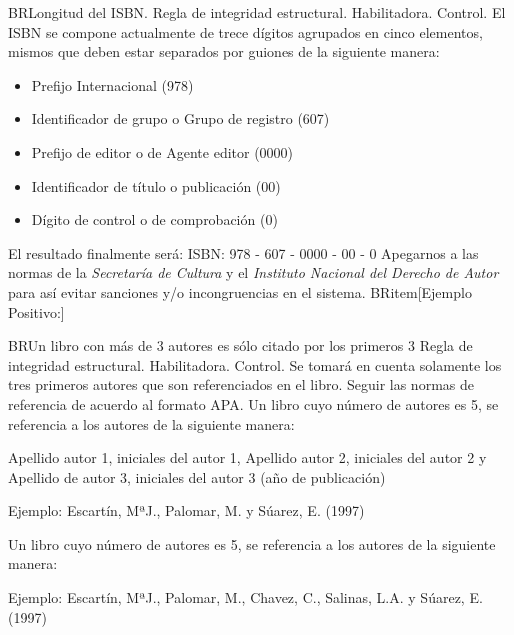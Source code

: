 \begin{BussinesRule}{BR}{Longitud del ISBN.}
    \BRitem[Tipo:] Regla de integridad estructural.
    \BRitem[Clase:] Habilitadora.
    \BRitem[Nivel:] Control.
    \BRitem[Descripción:] El ISBN se compone actualmente de trece dígitos agrupados en cinco elementos, mismos que deben estar separados por guiones de la siguiente manera:
    \begin{itemize}
        \item Prefijo Internacional (978)
        \item Identificador de grupo o Grupo de registro (607)
        \item Prefijo de editor o de Agente editor (0000)
        \item Identificador de título o publicación (00)
        \item Dígito de control o de comprobación (0)
    \end{itemize}
El resultado finalmente será:  ISBN: 978 - 607 - 0000 - 00 - 0
    \BRitem[Sentencia:]
    \BRitem[Motivación:] Apegarnos a las normas de la \emph{Secretaría de Cultura} y el \emph{Instituto Nacional del Derecho de Autor} para así evitar sanciones y/o incongruencias en el sistema.
    BRitem[Ejemplo Positivo:]
\end{BussinesRule}

\begin{BussinesRule}{BR}{Un libro con más de 3 autores es sólo citado por los primeros 3}
    \BRitem[Tipo:] Regla de integridad estructural.
    \BRitem[Clase:] Habilitadora.
    \BRitem[Nivel:] Control.
    \BRitem[Descripción:] Se tomará en cuenta solamente los tres primeros autores que son referenciados en el libro.
    \BRitem[Motivación:] Seguir las normas de referencia de acuerdo al formato APA.
     Un libro cuyo número de autores es 5, se referencia a los autores de la siguiente manera:

    Apellido autor 1, iniciales del autor 1, Apellido autor 2, iniciales del autor 2 y Apellido de autor 3, iniciales del autor 3 (año de publicación)

Ejemplo: Escartín, MªJ., Palomar, M. y Súarez, E. (1997)

     Un libro cuyo número de autores es 5, se referencia a los autores de la siguiente manera:

    Ejemplo: Escartín, MªJ., Palomar, M., Chavez, C., Salinas, L.A. y Súarez, E. (1997)
\end{BussinesRule}